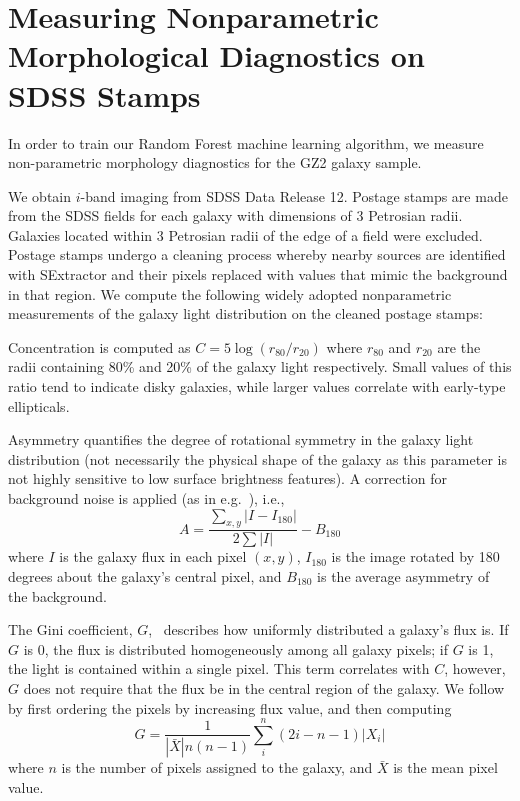 \documentclass[twocolumn,  trackchanges,]{aastex6}%
\newcommand{\rr}[1]{$r_{#1}$}
\begin{document}
\section{Measuring Nonparametric Morphological Diagnostics on SDSS Stamps}
\label{sec: measuring morphology}

In order to train our Random Forest machine learning algorithm, we measure  non-parametric
morphology diagnostics for the GZ2 galaxy sample. 

We obtain $i$-band imaging from SDSS Data Release 12. Postage stamps are made from 
the SDSS fields for each galaxy with dimensions of 3 Petrosian radii. Galaxies located 
within 3 Petrosian radii of the edge of a field were excluded.  Postage stamps undergo a
 cleaning process whereby nearby sources are identified with SExtractor \citep[ver. 2.8.6;][]{sextractor} and their pixels replaced with values that mimic the background in that region. 
We compute the following widely adopted nonparametric measurements  of the galaxy light distribution on the cleaned postage stamps:

Concentration is computed as $C = 5\log(r_{80}/ r_{20})$ where \rr{80} and \rr{20} are the
radii containing 80\% and 20\% of the galaxy light respectively.  Small values of this ratio 
tend to indicate disky galaxies, while larger values correlate with early-type ellipticals. 

Asymmetry quantifies the degree of rotational symmetry in the galaxy light distribution
 (not necessarily the physical shape of the galaxy as this parameter is not highly sensitive 
to low surface brightness features). A correction for background noise is applied (as in e.g.~\cite{Conselice2000}), i.e., 
\begin{equation}
A = \frac{\sum_{x,y} |I - I_{180}|}{ 2\sum|I|} - B_{180}
\end{equation}
where $I$ is the galaxy flux in each pixel $(x, y)$, $I_{180}$ is the image rotated by 180 degrees about the galaxy's central pixel, and $B_{180}$ is the average asymmetry of the background. 

The Gini coefficient, $G$,~\citep{Glasser1962, Abraham2003} describes how uniformly distributed a galaxy's flux is.  If $G$ is 0, the flux is distributed homogeneously among all galaxy pixels; if $G$ is 1,  the light is contained within a single pixel. This term correlates with $C$, however, $G$ does not require that the flux be in the central region of the galaxy.  We follow~\cite{Lotz2004} by first ordering the pixels by increasing flux value, and then computing
\begin{equation}
G = \frac{1}{|\bar X|n(n-1)}\sum_i^n(2i-n-1)|X_i|
\end{equation}
where $n$ is the number of pixels assigned to the galaxy, and $\bar X$ is the mean pixel value. 
\end{document}

